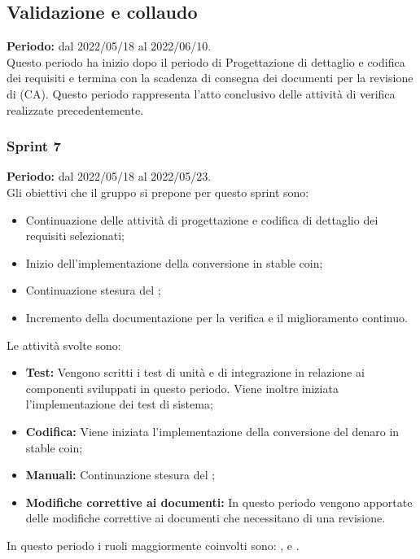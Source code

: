 
\subsection{Validazione e collaudo} \label{subsection:pianificazione_validazione}
\textbf{Periodo:} dal 2022/05/18 al 2022/06/10.
\bigskip
\\Questo periodo ha inizio dopo il periodo di Progettazione di dettaglio e codifica dei requisiti e termina con la scadenza di consegna dei documenti per la revisione di \CA{} (CA\glo{}).
Questo periodo rappresenta l'atto conclusivo delle attività di verifica realizzate precedentemente.

\subsubsection{Sprint 7} \label{subsubsection:sprint_7}
\textbf{Periodo:} dal 2022/05/18 al 2022/05/23.
\bigskip
\\Gli obiettivi che il gruppo si prepone per questo sprint\glo{} sono:
\begin{itemize}
  \item Continuazione delle attività di progettazione e codifica di dettaglio dei requisiti selezionati;
  \item Inizio dell'implementazione della conversione in stable coin\glo{};
  \item Continuazione stesura del \docNameVersionMS{};
  \item Incremento della documentazione per la verifica e il miglioramento continuo.
\end{itemize}
Le attività svolte sono:
\begin{itemize}
  \item \textbf{Test:} Vengono scritti i test di unità e di integrazione in relazione ai componenti sviluppati in questo periodo. Viene inoltre iniziata l'implementazione dei test di sistema;
  \item \textbf{Codifica:} Viene iniziata l'implementazione della conversione del denaro in stable coin\glo{};
  \item \textbf{Manuali:} Continuazione stesura del \docNameVersionMS{};
  \item \textbf{Modifiche correttive ai documenti:} In questo periodo vengono apportate delle modifiche correttive ai documenti che necessitano di una revisione.
\end{itemize}
In questo periodo i ruoli maggiormente coinvolti sono: \roleDesignerLow{}, \roleProgrammerLow{} e \roleVerifierLow{}.
